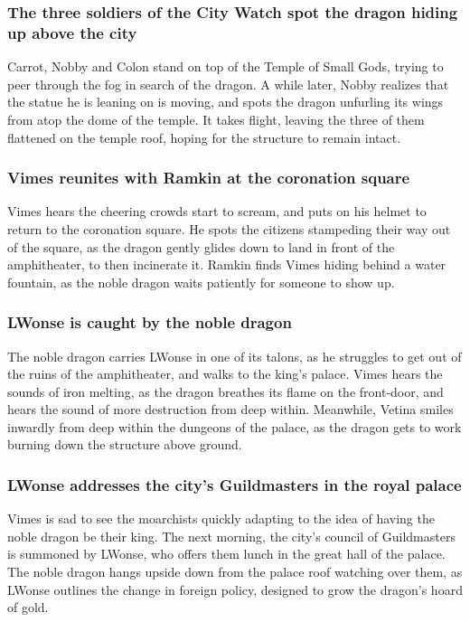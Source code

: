 \subsubsection{The three soldiers of the City Watch spot the dragon hiding up above the city}
\Gls{Carrot}, \Gls{Nobby} and \Gls{Colon} stand on top of the Temple of Small Gods, trying to peer
through the fog in search of the dragon. A while later, \Gls{Nobby} realizes that the statue he is
leaning on is moving, and spots the dragon unfurling its wings from atop the dome of the temple. It
takes flight, leaving the three of them flattened on the temple roof, hoping for the structure to
remain intact.

\subsubsection{\Gls{Vimes} reunites with \Gls{Ramkin} at the coronation square}
\Gls{Vimes} hears the cheering crowds start to scream, and puts on his helmet to return to the
coronation square. He spots the citizens stampeding their way out of the square, as the dragon
gently glides down to land in front of the amphitheater, to then incinerate it. \Gls{Ramkin} finds
\Gls{Vimes} hiding behind a water fountain, as the noble dragon waits patiently for someone to show
up.

\subsubsection{\Gls{LWonse} is caught by the noble dragon}
The noble dragon carries \Gls{LWonse} in one of its talons, as he struggles to get out of the
ruins of the amphitheater, and walks to the king's palace. \Gls{Vimes} hears the sounds of iron
melting, as the dragon breathes its flame on the front-door, and hears the sound of more destruction
from deep within. Meanwhile, \Gls{Vetina} smiles inwardly from deep within the dungeons of the
palace, as the dragon gets to work burning down the structure above ground.

\subsubsection{\Gls{LWonse} addresses the city's Guildmasters in the royal palace}
\Gls{Vimes} is sad to see the moarchists quickly adapting to the idea of having the noble dragon
be their king. The next morning, the city's council of Guildmasters is summoned by \Gls{LWonse},
who offers them lunch in the great hall of the palace. The noble dragon hangs upside down from the
palace roof watching over them, as \Gls{LWonse} outlines the change in foreign policy, designed to
grow the dragon's hoard of gold.

